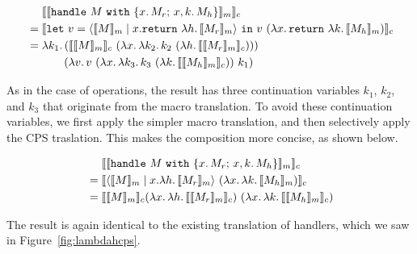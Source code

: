 \begin{align*}
& \hspace{4.7mm} \llbracket \llbracket \texttt{handle} \ M \ \texttt{with} \ \{ x. \, M_r; \, x, k. \, M_h \} \rrbracket_m \rrbracket_c \\
&= \llbracket \texttt{let} \ v = \langle \llbracket M \rrbracket_m \mid x.\texttt{return} \ \lambda h.\, \llbracket M_r \rrbracket_m \rangle \ \texttt{in} \ v \ (\lambda x.\, \texttt{return} \ \lambda k.\, \llbracket M_h \rrbracket_m) \rrbracket_c \\
&= \lambda k_1.\, (\llbracket \llbracket M \rrbracket_m \rrbracket_c \ (\lambda x.\, \lambda k_2.\, k_2 \ (\lambda h.\, \llbracket \llbracket M_r \rrbracket_m \rrbracket_c))) \\
& \hspace{1.16cm} (\lambda v.\, v \ (\lambda x.\, \lambda k_3.\, k_3 \ (\lambda k.\, \llbracket \llbracket M_h \rrbracket_m \rrbracket_c)) \ k_1)
\end{align*}

\vspace{1mm}

\noindent As in the case of operations, the result has three continuation
variables $k_1$, $k_2$, and $k_3$ that originate from the macro translation.
To avoid these continuation variables, we first apply the simpler macro 
translation, and then selectively apply the CPS traslation.
This makes the composition more concise, as shown below.

\vspace{-3mm}

\begin{align*}
& \hspace{4.7mm} \llbracket \llbracket \texttt{handle} \ M \ \texttt{with} \ \{ x. \, M_r; \, x, k. \, M_h \} \rrbracket_m \rrbracket_c \\
&= \llbracket \langle \llbracket M \rrbracket_m \mid x.\lambda h.\, \llbracket M_r \rrbracket_m \rangle \ (\lambda x.\, \lambda k.\, \llbracket M_h \rrbracket_m) \rrbracket_c \\
&= \llbracket \llbracket M \rrbracket_m \rrbracket_c{(\lambda x.\, \lambda h.\, \llbracket \llbracket M_r \rrbracket_m \rrbracket_c)} \ (\lambda x.\, \lambda k.\, \llbracket \llbracket M_h \rrbracket_m \rrbracket_c)
\end{align*}

\vspace{1mm}

\noindent The result is again identical to the existing translation 
of handlers, which we saw in Figure~\ref{fig:lambdahcps}.
